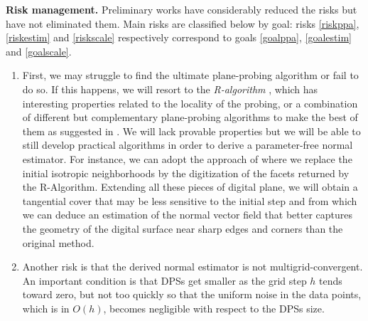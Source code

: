 \noindent\textbf{Risk management.}
Preliminary works have considerably reduced the risks but have not eliminated them.
Main risks are classified below by goal: risks \ref{riskppa}, \ref{riskestim} and \ref{riskscale}
respectively correspond to goals \ref{goalppa}, \ref{goalestim} and \ref{goalscale}. 
\begin{enumerate}[label=(R\arabic*)]
  \item %
First, we may struggle to find the ultimate plane-probing algorithm or fail to do so.
If this happens, we will resort to the \emph{R-algorithm} \cite{LPRJMIV2017}, which
has interesting properties related to the locality of the probing, or a combination
of different but complementary plane-probing algorithms to make the best of them
as suggested in \cite{LPRJMIV2017}. We will lack provable properties but we will be able to still
develop practical algorithms in order to derive a parameter-free normal estimator.
For instance, we can adopt the approach of \citeauthor*{Charrier2011} \cite{Charrier2011}
where we replace the initial isotropic neighborhoods by the digitization of the facets
returned by the R-Algorithm. Extending all these pieces of digital plane, we will obtain a
tangential cover that may be less sensitive to the initial step and from which we can
deduce an estimation of the normal vector field that better captures the geometry of
the digital surface near sharp edges and corners than the original method. \label{riskppa} 
\item %
Another risk is that the derived normal estimator is not multigrid-convergent.
An important condition is that DPSs get smaller as the grid step $h$ tends toward zero,
but not too quickly so that the uniform noise in the data points,
which is in $O(h)$, becomes negligible with respect to the DPSs size. 

\end{enumerate}
